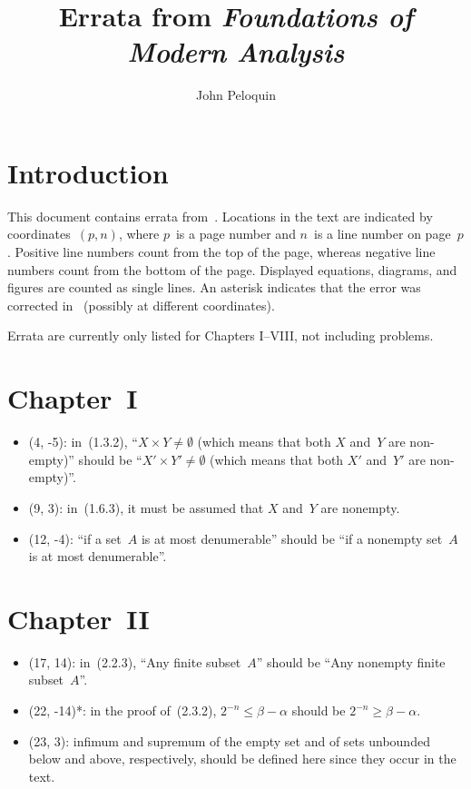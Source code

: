 \documentclass[letterpaper,12pt]{article}
\title{Errata from \textit{Foundations of Modern Analysis}}
\author{John Peloquin}
\date{}
\begin{document}
\maketitle
\section*{Introduction}
This document contains errata from~\cite{dieudonne8th}. Locations in the text are indicated by coordinates~\((p,n)\), where \(p\)~is a page number and \(n\)~is a line number on page~\(p\). Positive line numbers count from the top of the page, whereas negative line numbers count from the bottom of the page. Displayed equations, diagrams, and figures are counted as single lines. An asterisk indicates that the error was corrected in~\cite{dieudonne9th} (possibly at different coordinates).

Errata are currently only listed for Chapters I--VIII, not including problems.

\section*{Chapter~I}
\begin{itemize}
\item (4, -5): in~(1.3.2), ``\(X\times Y\ne\emptyset\) (which means that both \(X\) and~\(Y\) are non-empty)'' should be ``\(X'\times Y'\ne\emptyset\) (which means that both \(X'\) and~\(Y'\) are non-empty)''.
\item (9, 3): in~(1.6.3), it must be assumed that \(X\) and~\(Y\) are nonempty.
\item (12, -4): ``if a set~\(A\) is at most denumerable'' should be ``if a nonempty set~\(A\) is at most denumerable''.
\end{itemize}

\section*{Chapter~II}
\begin{itemize}
\item (17, 14): in~(2.2.3), ``Any finite subset~\(A\)'' should be ``Any nonempty finite subset~\(A\)''.
\item (22, -14)*: in the proof of~(2.3.2), \(2^{-n}\le\beta-\alpha\) should be \(2^{-n}\ge\beta-\alpha\).
\item (23, 3): infimum and supremum of the empty set and of sets unbounded below and above, respectively, should be defined here since they occur in the text.
\end{itemize}
\end{document}
